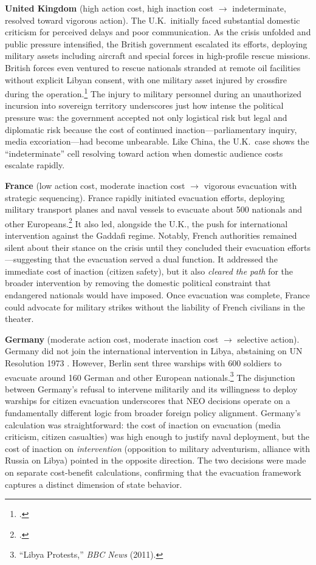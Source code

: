\documentclass[12pt]{article}
\begin{document}
\textbf{United Kingdom} (high action cost, high inaction cost $\rightarrow$ indeterminate, resolved toward vigorous action). The U.K.\ initially faced substantial domestic criticism for perceived delays and poor communication. As the crisis unfolded and public pressure intensified, the British government escalated its efforts, deploying military assets including aircraft and special forces in high-profile rescue missions. British forces even ventured to rescue nationals stranded at remote oil facilities without explicit Libyan consent, with one military asset injured by crossfire during the operation.\footnote{\citet{Schwarck2016}.} The injury to military personnel during an unauthorized incursion into sovereign territory underscores just how intense the political pressure was: the government accepted not only logistical risk but legal and diplomatic risk because the cost of continued inaction---parliamentary inquiry, media excoriation---had become unbearable. Like China, the U.K.\ case shows the ``indeterminate'' cell resolving toward action when domestic audience costs escalate rapidly.

\textbf{France} (low action cost, moderate inaction cost $\rightarrow$ vigorous evacuation with strategic sequencing). France rapidly initiated evacuation efforts, deploying military transport planes and naval vessels to evacuate about 500 nationals and other Europeans.\footnote{\citet{Cody2011}.} It also led, alongside the U.K., the push for international intervention against the Gaddafi regime. Notably, French authorities remained silent about their stance on the crisis until they concluded their evacuation efforts---suggesting that the evacuation served a dual function. It addressed the immediate cost of inaction (citizen safety), but it also \emph{cleared the path} for the broader intervention by removing the domestic political constraint that endangered nationals would have imposed. Once evacuation was complete, France could advocate for military strikes without the liability of French civilians in the theater.

\textbf{Germany} (moderate action cost, moderate inaction cost $\rightarrow$ selective action). Germany did not join the international intervention in Libya, abstaining on UN Resolution 1973 \citep{Rousseau2016}. However, Berlin sent three warships with 600 soldiers to evacuate around 160 German and other European nationals.\footnote{``Libya Protests,'' \emph{BBC News} (2011).} The disjunction between Germany's refusal to intervene militarily and its willingness to deploy warships for citizen evacuation underscores that NEO decisions operate on a fundamentally different logic from broader foreign policy alignment. Germany's calculation was straightforward: the cost of inaction on evacuation (media criticism, citizen casualties) was high enough to justify naval deployment, but the cost of inaction on \emph{intervention} (opposition to military adventurism, alliance with Russia on Libya) pointed in the opposite direction. The two decisions were made on separate cost-benefit calculations, confirming that the evacuation framework captures a distinct dimension of state behavior.
\end{document}
